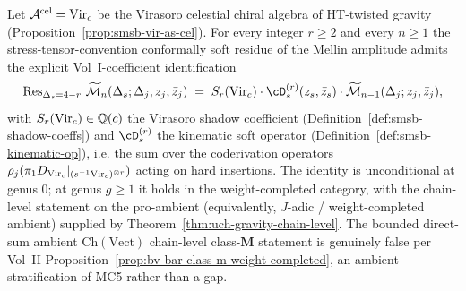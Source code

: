 \begin{theorem}
\label{thm:mellin-shadow-correspondence-explicit}
\ClaimStatusProvedHere
{}
Let $\mathcal A^{\mathrm{cel}} = \mathrm{Vir}_c$ be the Virasoro celestial chiral
algebra of HT-twisted gravity
(Proposition~\ref{prop:smsb-vir-as-cel}). For every integer $r \geq 2$
and every $n \geq 1$ the stress-tensor-convention conformally soft
residue of the Mellin amplitude admits the explicit
Vol~I-coefficient identification
\begin{equation}
\label{eq:smsb-bridge-identity}
 \Res_{\Delta_s = 4 - r}\,
 \Mel\cM_n(\Delta_s; \Delta_j, z_j, \bar z_j)
 \;=\;
 S_r(\Vir_c)\cdot
 \cD_s^{(r)}(z_s, \bar z_s)\cdot
 \Mel\cM_{n-1}(\Delta_j; z_j, \bar z_j),
\end{equation}
with $S_r(\mathrm{Vir}_c) \in \mathbb Q(c)$ the Virasoro shadow coefficient
(Definition~\ref{def:smsb-shadow-coeffs}) and $\cD_s^{(r)}$ the
kinematic soft operator (Definition~\ref{def:smsb-kinematic-op}), i.e.
the sum over the coderivation operators
\(\rho_j(\pi_1D_{\mathrm{Vir}_c}|_{(s^{-1}\mathrm{Vir}_c)^{\otimes r}})\) acting on
hard insertions. The
identity is unconditional at genus $0$; at genus $g \geq 1$ it holds in
the weight-completed category, with the chain-level statement on the
pro-ambient (equivalently, $J$-adic / weight-completed ambient)
supplied by Theorem~\ref{thm:uch-gravity-chain-level}. The bounded
direct-sum ambient $\mathrm{Ch}(\mathrm{Vect})$ chain-level
class-$\mathbf M$ statement is genuinely false per Vol~II
Proposition~\ref{prop:bv-bar-class-m-weight-completed}, an
ambient-stratification of MC5 rather than a gap.
\end{theorem}

